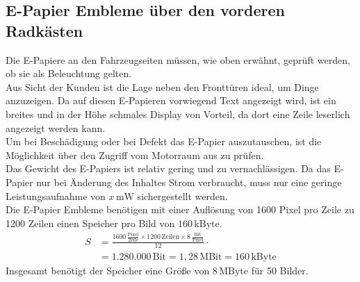 \subsection{E-Papier Embleme über den vorderen Radkästen}
Die E-Papiere an den Fahrzeugseiten müssen, wie oben erwähnt, geprüft werden, ob sie als Beleuchtung gelten.\\
Aus Sicht der Kunden ist die Lage neben den Fronttüren ideal, um Dinge anzuzeigen.
Da auf diesen E-Papieren vorwiegend Text angezeigt wird, ist ein breites und in der Höhe schmales Display von Vorteil, da dort eine Zeile leserlich angezeigt werden kann. \\
Um bei Beschädigung oder bei Defekt das E-Papier auszutauschen, ist die Möglichkeit über den Zugriff vom Motorraum aus zu prüfen. \\
Das Gewicht des E-Papiers ist relativ gering und zu vernachlässigen.
Da das E-Papier nur bei Änderung des Inhaltes Strom verbraucht, muss nur eine geringe Leistungsaufnahme von $ x\,\mathrm{mW} $ sichergestellt werden. \\
Die E-Papier Embleme benötigen mit einer Auflösung von 1600 Pixel pro Zeile zu 1200 Zeilen einen Speicher pro Bild von $ 160\,\mathrm{kByte} $.
\begin{align}
	S &= \frac{1600\,\frac{\mathrm{Pixel}}{\mathrm{Zeile}} \times 1200\,\mathrm{Zeilen} \times 8\,\frac{\mathrm{Bit}}{\mathrm{Pixel}}}{12} \cdot \\
	&= 1.280.000\,\mathrm{Bit} = 1,28\,\mathrm{MBit} = 160\,\mathrm{kByte}
\end{align}
Insgesamt benötigt der Speicher eine Größe von $ 8\,\mathrm{MByte} $ für 50 Bilder.
